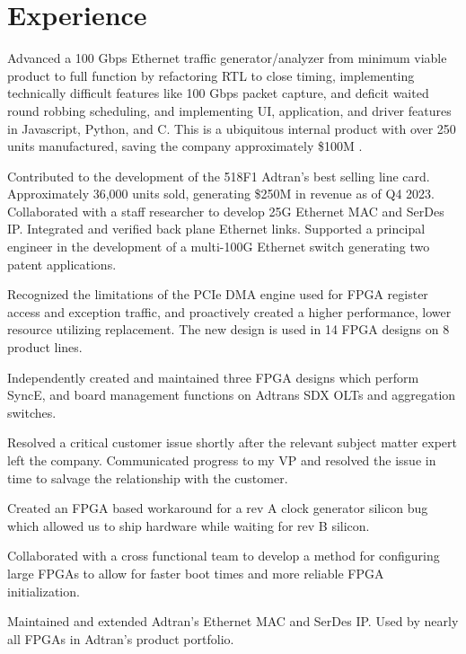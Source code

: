 \documentclass[10pt]{deedy-resume-reversed}
\begin{document}
\begin{minipage}[t]{1.0\textwidth}
\section{Experience}
\vspace{\topsep} %
\begin{tightemize}
\item Advanced a 100 Gbps Ethernet traffic generator/analyzer from minimum viable product to full function by refactoring RTL to close timing, 
implementing technically difficult features like 100 Gbps packet capture, and deficit waited round robbing scheduling, and implementing UI, application, 
and driver features in Javascript, Python, and C. This is a ubiquitous internal product with over 250 units manufactured, saving the company approximately \$100M .
\item Contributed to the development of the 518F1 Adtran’s best selling line card. Approximately  36,000 units sold, generating \$250M in revenue as of Q4 2023. 
Collaborated with a staff researcher to develop 25G Ethernet MAC and SerDes IP.
Integrated and verified back plane Ethernet links.
Supported a principal engineer in the development of a multi-100G Ethernet switch generating two patent applications.
\item Recognized the limitations of the PCIe DMA engine used for FPGA register access and exception traffic, 
and proactively created a higher performance, lower resource utilizing replacement. The new design is used in 14 FPGA designs on 8 product lines.
\item Independently created and maintained three FPGA designs which perform SyncE, and board management functions on Adtrans SDX OLTs and aggregation switches. 
\item Resolved a critical customer issue shortly after the relevant subject matter expert left the company. 
Communicated progress to my VP and resolved the issue in time to salvage the relationship with the customer.
\item Created an FPGA based workaround for a rev A clock generator silicon bug which allowed us to ship hardware while waiting for rev B silicon.
\item Collaborated with a cross functional team to develop a method for configuring large FPGAs to allow for faster boot times and more reliable FPGA initialization.
\item Maintained and extended Adtran’s Ethernet MAC and SerDes IP. Used by nearly all FPGAs in Adtran’s product portfolio.

\end{tightemize}
\end{minipage}
\end{document}
